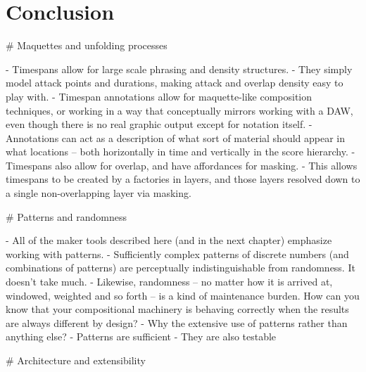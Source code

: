 \chapter{Conclusion}
\label{chap:conclusion}

\begin{markdown}

# Maquettes and unfolding processes

- Timespans allow for large scale phrasing and density structures.
- They simply model attack points and durations, making attack and overlap
  density easy to play with.
- Timespan annotations allow for maquette-like composition techniques, or
  working in a way that conceptually mirrors working with a DAW, even though
  there is no real graphic output except for notation itself.
- Annotations can act as a description of what sort of material should appear
  in what locations -- both horizontally in time and vertically in the score
  hierarchy.
- Timespans also allow for overlap, and have affordances for masking.
- This allows timespans to be created by a factories in layers, and those
  layers resolved down to a single non-overlapping layer via masking.

# Patterns and randomness

- All of the maker tools described here (and in the next chapter) emphasize
  working with patterns.
- Sufficiently complex patterns of discrete numbers (and combinations of
  patterns) are perceptually indistinguishable from randomness. It doesn't
  take much.
- Likewise, randomness -- no matter how it is arrived at, windowed, weighted
  and so forth -- is a kind of maintenance burden. How can you know that
  your compositional machinery is behaving correctly when the results are
  always different by design?
- Why the extensive use of patterns rather than anything else?
- Patterns are sufficient
- They are also testable

# Architecture and extensibility


\end{markdown}
